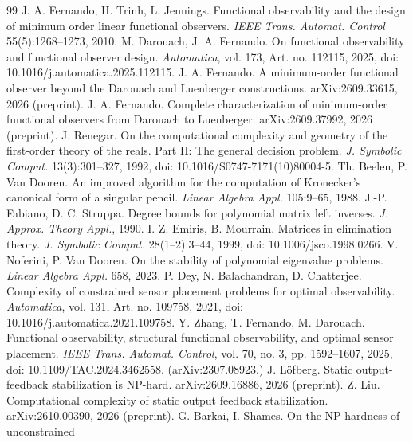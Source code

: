\documentclass[journal]{IEEEtran}
\theoremstyle{plainn}
\begin{document}
\begin{thebibliography}{99}
 J. A. Fernando, H. Trinh, L. Jennings. Functional observability and the design of minimum order linear functional observers. \emph{IEEE Trans. Automat. Control} 55(5):1268--1273, 2010.
 M. Darouach, J. A. Fernando. On functional observability and functional observer design. \emph{Automatica}, vol. 173, Art. no. 112115, 2025, doi: 10.1016/j.automatica.2025.112115.
 J. A. Fernando. A minimum-order functional observer beyond the Darouach and Luenberger constructions. arXiv:2609.33615, 2026 (preprint).
 J. A. Fernando. Complete characterization of minimum-order functional observers from Darouach to Luenberger. arXiv:2609.37992, 2026 (preprint).
 J. Renegar. On the computational complexity and geometry of the first-order theory of the reals. Part II: The general decision problem. \emph{J. Symbolic Comput.} 13(3):301--327, 1992, doi: 10.1016/S0747-7171(10)80004-5.
 Th. Beelen, P. Van Dooren. An improved algorithm for the computation of Kronecker's canonical form of a singular pencil. \emph{Linear Algebra Appl.} 105:9--65, 1988.
 J.-P. Fabiano, D. C. Struppa. Degree bounds for polynomial matrix left inverses. \emph{J. Approx. Theory Appl.}, 1990.
 I. Z. Emiris, B. Mourrain. Matrices in elimination theory. \emph{J. Symbolic Comput.} 28(1--2):3--44, 1999, doi: 10.1006/jsco.1998.0266.
 V. Noferini, P. Van Dooren. On the stability of polynomial eigenvalue problems. \emph{Linear Algebra Appl.} 658, 2023.
 P. Dey, N. Balachandran, D. Chatterjee. Complexity of
  constrained sensor placement problems for optimal observability.
  \emph{Automatica}, vol. 131, Art. no. 109758, 2021,
  doi: 10.1016/j.automatica.2021.109758.
 Y. Zhang, T. Fernando, M. Darouach. Functional
  observability, structural functional observability, and optimal sensor
  placement. \emph{IEEE Trans. Automat. Control}, vol. 70, no. 3,
  pp. 1592--1607, 2025, doi: 10.1109/TAC.2024.3462558.
  (arXiv:2307.08923.)
 J. L\"{o}fberg. Static output-feedback stabilization is
  NP-hard. arXiv:2609.16886, 2026 (preprint).
 Z. Liu. Computational complexity of static output feedback
  stabilization. arXiv:2610.00390, 2026 (preprint).
 G. Barkai, I. Shames. On the NP-hardness of unconstrained

\end{thebibliography}
\end{document}
